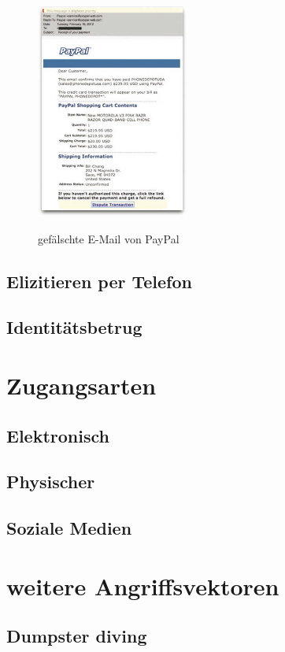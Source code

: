 \begin{figure}[!h]
    \centering
\includegraphics[width = 5cm]{figures/ChristopherHadn_2014_Kapitel2WasIstSocialE_SocialEngineeringEntt.jpg}
\caption{gefälschte E-Mail von PayPal}
\cite{GrundformenDesSE}
\label{fig:PhishingPayPal}
\end{figure}




\subsection{Elizitieren per Telefon}
\subsection{Identitätsbetrug}

\section{Zugangsarten}

\subsection{Elektronisch}
\subsection{Physischer}
\subsection{Soziale Medien}

\section{weitere Angriffsvektoren}

\subsection{Dumpster diving}
